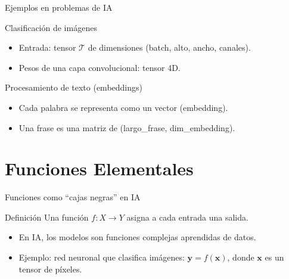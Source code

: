\documentclass[aspectratio=169, 10pt, xcolor=table]{beamer}
\begin{document}
\begin{frame}{Ejemplos en problemas de IA}
    \begin{exampleblock}{Clasificación de imágenes}
        \begin{itemize}
            \item Entrada: tensor $\mathcal{T}$ de dimensiones (batch, alto, ancho, canales).
            \item Pesos de una capa convolucional: tensor 4D.
        \end{itemize}
    \end{exampleblock}
    \begin{exampleblock}{Procesamiento de texto (embeddings)}
        \begin{itemize}
            \item Cada palabra se representa como un vector (embedding).
            \item Una frase es una matriz de (largo\_frase, dim\_embedding).
        \end{itemize}
    \end{exampleblock}
\end{frame}

\section{Funciones Elementales}

\begin{frame}{Funciones como ``cajas negras'' en IA}
    \begin{block}{Definición}
        Una función $f: X \rightarrow Y$ asigna a cada entrada una salida.
    \end{block}
    \begin{itemize}
        \item En IA, los modelos son funciones complejas aprendidas de datos.
        \item Ejemplo: red neuronal que clasifica imágenes: $\mathbf{y} = f(\mathbf{x})$, donde $\mathbf{x}$ es un tensor de píxeles.
    \end{itemize}
\end{frame}
\end{document}
